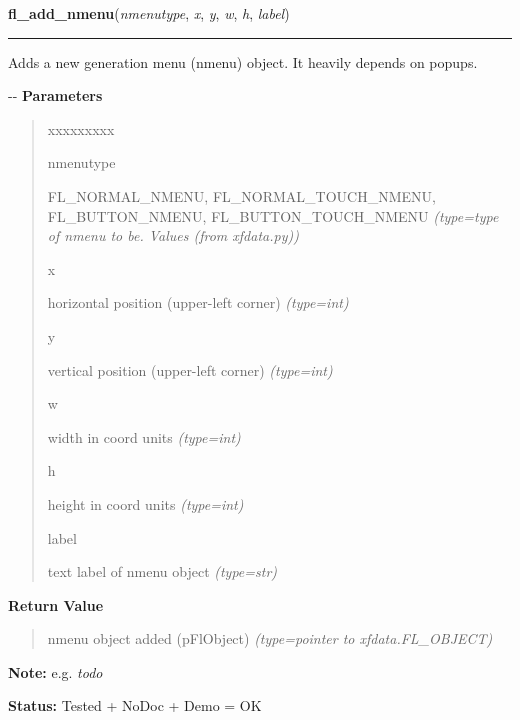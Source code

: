     \vspace{0.5ex}

\hspace{.8\funcindent}\begin{boxedminipage}{\funcwidth}

    \raggedright \textbf{fl\_add\_nmenu}(\textit{nmenutype}, \textit{x}, \textit{y}, \textit{w}, \textit{h}, \textit{label})

    \vspace{-1.5ex}

    \rule{\textwidth}{0.5\fboxrule}
\setlength{\parskip}{2ex}

Adds a new generation menu (nmenu) object. It heavily depends on
popups.

-{}-
\setlength{\parskip}{1ex}
      \textbf{Parameters}
      \vspace{-1ex}

      \begin{quote}
        \begin{Ventry}{xxxxxxxxx}

          \item[nmenutype]


FL\_NORMAL\_NMENU, FL\_NORMAL\_TOUCH\_NMENU, FL\_BUTTON\_NMENU,
FL\_BUTTON\_TOUCH\_NMENU
            {\it (type=type of nmenu to be. Values (from xfdata.py))}

          \item[x]


horizontal position (upper-left corner)
            {\it (type=int)}

          \item[y]


vertical position (upper-left corner)
            {\it (type=int)}

          \item[w]


width in coord units
            {\it (type=int)}

          \item[h]


height in coord units
            {\it (type=int)}

          \item[label]


text label of nmenu object
            {\it (type=str)}

        \end{Ventry}

      \end{quote}

      \textbf{Return Value}
    \vspace{-1ex}

      \begin{quote}

nmenu object added (pFlObject)
      {\it (type=pointer to xfdata.FL\_OBJECT)}

      \end{quote}

\textbf{Note:} 
e.g. \emph{todo}


\textbf{Status:} 
Tested + NoDoc + Demo = OK


    \end{boxedminipage}

